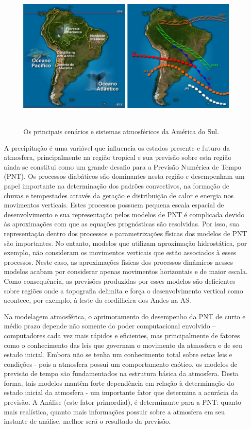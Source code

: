 \begin{figure}[!hbp]
\centering
\includegraphics[height=7.5cm]{./figs/fig02.png}
\caption{Os principais cenários e sistemas atmosféricos da América do Sul.}
\label{fig01}
\end{figure}

A precipitação é uma variável que influencia os estados presente e futuro da atmosfera,  principalmente na região tropical e sua previsão sobre esta região ainda se constitui como um grande desafio para a Previsão Numérica de Tempo (PNT). Os processos diabáticos são dominantes nesta região e desempenham um papel importante na determinação dos padrões convectivos, na formação de chuvas e tempestades através da geração e distribuição de calor e energia nos movimentos verticais. Estes processos possuem pequena escala espacial de desenvolvimento e sua representação pelos modelos de PNT é complicada devido às aproximações com que as equações prognósticas são resolvidas. Por isso, sua representação dentro dos processos e parametrizações físicas dos modelos de PNT são importantes. No entanto, modelos que utilizam aproximação hidrostática, por exemplo, não consideram os movimentos verticais que estão associados à esses processos. Neste caso, as aproximações físicas dos processos dinâmicos nesses modelos acabam por considerar apenas movimentos horizontais e de maior escala. Como consequência, as previsões produzidas por esses modelos são deficientes sobre regiões onde a topografia delimita e força o desenvolvimento vertical como acontece, por exemplo, à leste da cordilheira dos Andes na AS. 

Na modelagem atmosférica, o aprimoramento do desempenho da PNT de curto e médio prazo depende não somente do poder computacional envolvido – computadores cada vez mais rápidos e eficientes, mas principalmente de fatores como o conhecimento das leis que governam o movimento da atmosfera e de seu estado inicial.  Embora não se tenha um conhecimento total sobre estas leis e condições - pois a atmosfera possui um comportamento caótico, os modelos de previsão de tempo são fundamentados na estrutura básica da atmosfera. Desta forma, tais modelos mantêm forte dependência em relação à determinação do estado inicial da atmosfera - um importante fator que determina a acurácia da previsão. A Análise (este fator primordial), é determinante para a PNT: quanto mais realística, quanto mais informações possuir sobre a atmosfera em seu instante de análise, melhor será o resultado da previsão.

